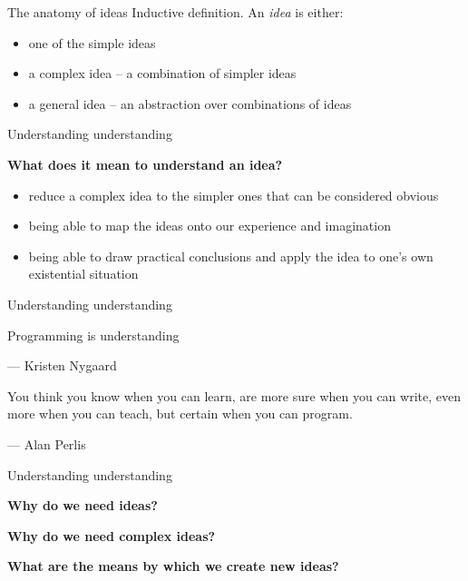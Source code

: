 \documentclass{beamer}
\begin{document}
\begin{frame}{The anatomy of ideas}
  Inductive definition. An \textit{idea} is either:
  \begin{itemize}
    \pause
  \item one of the simple ideas
    \pause
  \item a complex idea -- a combination of simpler ideas
    \pause
  \item a general idea -- an abstraction over combinations of ideas
  \end{itemize}
\end{frame}


\begin{frame}{Understanding understanding}

  \textbf{What does it mean to understand an idea?}
  \begin{itemize}
    \pause
  \item reduce a complex idea to the simpler ones that can be considered
    obvious
    \pause
  \item being able to map the ideas onto our experience and imagination
    \pause
  \item being able to draw practical conclusions and apply the idea to
    one's own existential situation
  \end{itemize}

\end{frame}


\begin{frame}{Understanding understanding}

  \pause
  \begin{displayquote}
    Programming is understanding
  \end{displayquote}
  --- Kristen Nygaard

  \pause
  \begin{displayquote}
    You think you know when you can learn, are more sure when you can write,
    even more when you can teach, but certain when you can program.
  \end{displayquote}
  --- Alan Perlis
  
\end{frame}

\begin{frame}{Understanding understanding}
  
  \textbf{Why do we need ideas?}
  \pause
  
  \textbf{Why do we need complex ideas?}
  \pause

  \textbf{What are the means by which we create new ideas?}
  
\end{frame}
\end{document}
